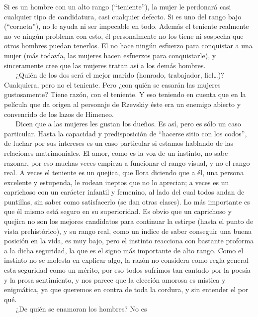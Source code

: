 Si es un hombre con un alto rango (``teniente''), la mujer le perdonará
casi cualquier tipo de candidatura, casi cualquier defecto. Si es uno
del rango bajo (``corneta''), no le ayuda ni ser impecable en todo.
Además el teniente realmente no ve ningún problema con esto, él
personalmente no los tiene ni sospecha que otros hombres puedan
tenerlos. El no hace ningún esfuerzo para conquistar a una mujer (más
todavía, las mujeres hacen esfuerzos para conquistarle), y sinceramente
cree que las mujeres tratan así a los demás hombres.\\
\hspace*{0.333em} ~ ~ ¿Quién de los dos será el mejor marido (honrado,
trabajador, fiel\ldots{})? Cualquiera, pero no el teniente. Pero ¿con
quién se casarán las mujeres gustosamente? Tiene razón, con el teniente.
Y eso teniendo en cuenta que en la película que da origen al personaje
de Rzevskiy éste era un enemigo abierto y convencido de los lazos de
Himeneo.\\
\hspace*{0.333em} ~ ~ Dicen que a las mujeres les gustan los dueños. Es
así, pero es sólo un caso particular. Hasta la capacidad y
predisposición de ``hacerse sitio con los codos'', de luchar por sus
intereses es un caso particular si estamos hablando de las relaciones
matrimoniales. El amor, como es la voz de un instinto, no sabe razonar,
por eso muchas veces empieza a funcionar el rango visual, y no el rango
real. A veces el teniente es un quejica, que llora diciendo que a él,
una persona excelente y estupenda, le rodean ineptos que no lo aprecian;
a veces es un caprichoso con un carácter infantil y femenino, al lado
del cual todos andan de puntillas, sin saber como satisfacerlo (se dan
otras clases). Lo más importante es que él mismo está seguro en su
superioridad. Es obvio que un caprichoso y quejica no son los mejores
candidatos para continuar la estirpe (hasta el punto de vista
prehistórico), y su rango real, como un índice de saber conseguir una
buena posición en la vida, es muy bajo, pero el instinto reacciona con
bastante proforma a la dicha seguridad, la que es el signo más
importante de alto rango. Como el instinto no se molesta en explicar
algo, la razón no considera como regla general esta seguridad como un
mérito, por eso todos sufrimos tan cantado por la poesía y la prosa
sentimiento, y nos parece que la elección amorosa es mística y
enigmática, ya que queremos en contra de toda la cordura, y sin entender
el por qué.\\
\hspace*{0.333em} ~ ~ ¿De quién se enamoran los hombres? No es
